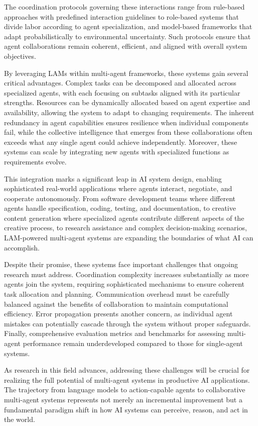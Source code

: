 \documentclass[journal,twoside,10pt]{IEEEtran}
\begin{document}
The coordination protocols governing these interactions range from rule-based approaches with predefined interaction guidelines to role-based systems that divide labor according to agent specialization, and model-based frameworks that adapt probabilistically to environmental uncertainty. Such protocols ensure that agent collaborations remain coherent, efficient, and aligned with overall system objectives.

By leveraging LAMs within multi-agent frameworks, these systems gain several critical advantages. Complex tasks can be decomposed and allocated across specialized agents, with each focusing on subtasks aligned with its particular strengths. Resources can be dynamically allocated based on agent expertise and availability, allowing the system to adapt to changing requirements. The inherent redundancy in agent capabilities ensures resilience when individual components fail, while the collective intelligence that emerges from these collaborations often exceeds what any single agent could achieve independently. Moreover, these systems can scale by integrating new agents with specialized functions as requirements evolve.

This integration marks a significant leap in AI system design, enabling sophisticated real-world applications where agents interact, negotiate, and cooperate autonomously. From software development teams where different agents handle specification, coding, testing, and documentation, to creative content generation where specialized agents contribute different aspects of the creative process, to research assistance and complex decision-making scenarios, LAM-powered multi-agent systems are expanding the boundaries of what AI can accomplish.

Despite their promise, these systems face important challenges that ongoing research must address. Coordination complexity increases substantially as more agents join the system, requiring sophisticated mechanisms to ensure coherent task allocation and planning. Communication overhead must be carefully balanced against the benefits of collaboration to maintain computational efficiency. Error propagation presents another concern, as individual agent mistakes can potentially cascade through the system without proper safeguards. Finally, comprehensive evaluation metrics and benchmarks for assessing multi-agent performance remain underdeveloped compared to those for single-agent systems.

As research in this field advances, addressing these challenges will be crucial for realizing the full potential of multi-agent systems in productive AI applications. The trajectory from language models to action-capable agents to collaborative multi-agent systems represents not merely an incremental improvement but a fundamental paradigm shift in how AI systems can perceive, reason, and act in the world.
\end{document}
